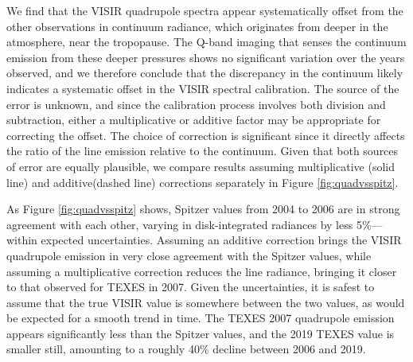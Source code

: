 \documentclass[twocolumn,10pt]{aastex631}
\begin{document}
We find that the VISIR quadrupole spectra appear systematically offset from the other observations in continuum radiance, which originates from deeper in the atmosphere, near the tropopause. The Q-band imaging that senses the continuum emission from these deeper pressures shows no significant variation over the years observed, and we therefore conclude that the discrepancy in the continuum likely indicates a systematic offset in the VISIR spectral calibration. The source of the error is unknown, and since the calibration process involves both division and subtraction, either a multiplicative or additive factor may be appropriate for correcting the offset. The choice of correction is significant since it directly affects the ratio of the line emission relative to the continuum.  Given that both sources of error are equally plausible, we compare results assuming multiplicative (solid line) and additive(dashed line) corrections separately in Figure \ref{fig:quadvsspitz}.  

As Figure \ref{fig:quadvsspitz} shows, Spitzer values from 2004 to 2006 are in strong agreement with each other, varying in disk-integrated radiances by less 5\%---within expected uncertainties.  Assuming an additive correction brings the VISIR quadrupole emission in very close agreement with the Spitzer values, while assuming a multiplicative correction reduces the line radiance, bringing it closer to that observed for TEXES in 2007.  Given the uncertainties, it is safest to assume that the true VISIR value is somewhere between the two values, as would be expected for a smooth trend in time. The TEXES 2007 quadrupole emission appears significantly less than the Spitzer values, and the 2019 TEXES value is smaller still, amounting to a roughly 40\% decline between 2006 and 2019. 
\end{document}
